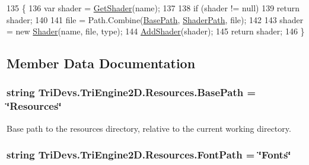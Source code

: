 \begin{DoxyCode}
135         \{
136             var shader = \hyperlink{class_tri_devs_1_1_tri_engine2_d_1_1_resources_aa70bf83db079865f59af844c2740433e}{GetShader}(name);
137 
138             \textcolor{keywordflow}{if} (shader != null)
139                 \textcolor{keywordflow}{return} shader;
140 
141             file = Path.Combine(\hyperlink{class_tri_devs_1_1_tri_engine2_d_1_1_resources_aa82e4dd3095618655c81abefb5c407fe}{BasePath}, \hyperlink{class_tri_devs_1_1_tri_engine2_d_1_1_resources_ae1076be4f324014f90d33f5b1ac49625}{ShaderPath}, file);
142 
143             shader = \textcolor{keyword}{new} \hyperlink{class_tri_devs_1_1_tri_engine2_d_1_1_shaders_1_1_shader}{Shader}(name, file, type);
144             \hyperlink{class_tri_devs_1_1_tri_engine2_d_1_1_resources_a7ee2414271382ccc08f969f0c4d81758}{AddShader}(shader);
145             \textcolor{keywordflow}{return} shader;
146         \}
\end{DoxyCode}


\subsection{Member Data Documentation}
\hypertarget{class_tri_devs_1_1_tri_engine2_d_1_1_resources_aa82e4dd3095618655c81abefb5c407fe}{
\subsubsection[{Base\-Path}]{\setlength{\rightskip}{0pt plus 5cm}string Tri\-Devs.\-Tri\-Engine2\-D.\-Resources.\-Base\-Path = \char`\"{}Resources\char`\"{}\hspace{0.3cm}{\ttfamily [static]}}}\label{class_tri_devs_1_1_tri_engine2_d_1_1_resources_aa82e4dd3095618655c81abefb5c407fe}


Base path to the resources directory, relative to the current working directory. 

\hypertarget{class_tri_devs_1_1_tri_engine2_d_1_1_resources_a3a9185a6ea2eff4b541a494e659c9d03}{
\subsubsection[{Font\-Path}]{\setlength{\rightskip}{0pt plus 5cm}string Tri\-Devs.\-Tri\-Engine2\-D.\-Resources.\-Font\-Path = \char`\"{}Fonts\char`\"{}\hspace{0.3cm}{\ttfamily [static]}}}\label{class_tri_devs_1_1_tri_engine2_d_1_1_resources_a3a9185a6ea2eff4b541a494e659c9d03}


